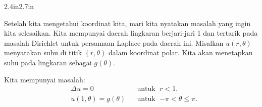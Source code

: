 \begin{mywrapfigsimp}{2.4in}{2.7in}
\noindent
{}
\end{mywrapfigsimp}
Setelah kita mengetahui koordinat kita, mari kita nyatakan masalah yang ingin
kita selesaikan.  Kita mempunyai daerah lingkaran berjari-jari 1 dan tertarik
pada masalah Dirichlet untuk persamaan Laplace pada daerah ini.  Misalkan
$u(r,\theta)$ menyatakan suhu di titik $(r,\theta)$ dalam koordinat
polar.
Kita akan menetapkan suhu pada lingkaran sebagai $g(\theta)$.

Kita mempunyai masalah:
\begin{equation} \label{dirichdisc:theprobeq}
\begin{aligned}
& \Delta u = 0  & & \text{untuk } \; r < 1, \\
& u(1,\theta) = g(\theta) & & \text{untuk } \; {-\pi} < \theta \leq \pi.
\end{aligned}
\end{equation}

